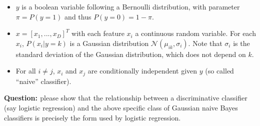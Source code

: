 \documentclass[UTF8,12pt, a4paper]{ctexart}
\begin{document}
\begin{itemize}
  \item $y$ is a boolean variable following a Bernoulli distribution, with parameter $\pi=P(y=1)$ and thus $P(y=0)=1-\pi$.
  \item $x=\left[x_1, ...,x_D\right]^T$ with each feature $x_i$ a continuous random variable. For each $x_i$, $P(x_i|y=k)$ is a Gaussian distribution $\mathcal{N}(\mu_{ik}, \sigma_i)$. Note that $\sigma_i$ is the standard deviation of the Gaussian distribution, which does not depend on $k$.
  \item For all $i \not= j$, $x_i$ and $x_j$ are conditionally independent given $y$ (so called “naive” classifier).
\end{itemize}
\textbf{\large{Question: }} 
please show that the relationship between a discriminative classifier (say logistic regression) and the above specific class of Gaussian naive Bayes classifiers is precisely the form used by logistic regression. \\
\end{document}
